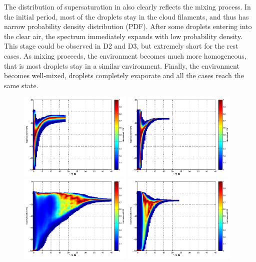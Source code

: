 \documentclass[draft,jgrga]{AGUTeX}
\begin{document}
\begin{article}
The distribution of supersaturation in  also clearly reflects the mixing process. In the initial period, most of the droplets stay in the cloud filaments, and thus has narrow probability density distribution (PDF). After some droplets entering into the clear air, the spectrum immediately expands with low probability density. This stage could be observed in D2 and D3, but extremely short for the rest cases. As mixing proceeds, the environment becomes much more homogeneous, that is most droplets stay in a similar environment. Finally, the environment becomes well-mixed, droplets completely evaporate and all the cases reach the same state.
\begin{figure}[H]\centering
\includegraphics[width=0.48\textwidth]{Figures/pdf_supersat_d1}
\includegraphics[width=0.48\textwidth]{Figures/pdf_supersat_f1}\\
\includegraphics[width=0.48\textwidth]{Figures/pdf_supersat_d2}
\includegraphics[width=0.48\textwidth]{Figures/pdf_supersat_f2}\\

\end{figure}
\end{article}
\end{document}

